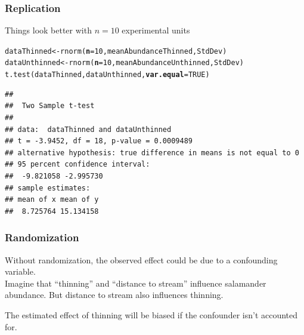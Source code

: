 \documentclass[color=usenames,dvipsnames]{beamer}\usepackage[]{graphicx}\usepackage[]{color}
\makeatletter
\newcommand{\hlnum}[1]{\textcolor[rgb]{0.69,0.494,0}{#1}}%
\newcommand{\hlstd}[1]{\textcolor[rgb]{0,0,0}{#1}}%
\newcommand{\hlkwb}[1]{\textcolor[rgb]{0,0.341,0.682}{#1}}%
\newcommand{\hlkwc}[1]{\textcolor[rgb]{0,0,0}{\textbf{#1}}}%
\newcommand{\hlkwd}[1]{\textcolor[rgb]{0.004,0.004,0.506}{#1}}%
\newenvironment{kframe}{%
 \def\at@end@of@kframe{}%
 \ifinner\ifhmode%
  \def\at@end@of@kframe{\end{minipage}}%
  \begin{minipage}{\columnwidth}%
 \fi\fi%
 \def\FrameCommand##1{\hskip\@totalleftmargin \hskip-\fboxsep
 \colorbox{shadecolor}{##1}\hskip-\fboxsep
     \hskip-\linewidth \hskip-\@totalleftmargin \hskip\columnwidth}%
 \MakeFramed {\advance\hsize-\width
   \@totalleftmargin\z@ \linewidth\hsize
   \@setminipage}}%
 {\par\unskip\endMakeFramed%
 \at@end@of@kframe}
\newenvironment{knitrout}{}{} %
\makeatother
\begin{document}
\begin{frame}[fragile]
  \frametitle{Replication}
  Things look better with $n=10$ experimental units \\
\begin{knitrout}\scriptsize
{}\color{fgcolor}\begin{kframe}
\begin{alltt}
\hlstd{dataThinned} \hlkwb{<-} \hlkwd{rnorm}\hlstd{(}\hlkwc{n}\hlstd{=}\hlnum{10}\hlstd{, meanAbundanceThinned, StdDev)}
\hlstd{dataUnthinned} \hlkwb{<-} \hlkwd{rnorm}\hlstd{(}\hlkwc{n}\hlstd{=}\hlnum{10}\hlstd{, meanAbundanceUnthinned, StdDev)}
\hlkwd{t.test}\hlstd{(dataThinned, dataUnthinned,} \hlkwc{var.equal}\hlstd{=}\hlnum{TRUE}\hlstd{)}
\end{alltt}
\begin{verbatim}
## 
## 	Two Sample t-test
## 
## data:  dataThinned and dataUnthinned
## t = -3.9452, df = 18, p-value = 0.0009489
## alternative hypothesis: true difference in means is not equal to 0
## 95 percent confidence interval:
##  -9.821058 -2.995730
## sample estimates:
## mean of x mean of y 
##  8.725764 15.134158
\end{verbatim}
\end{kframe}
\end{knitrout}
\end{frame}



\begin{frame}
  \frametitle{Randomization}
  \small
  Without randomization, the observed effect could be due to a
  confounding variable. \\ %
  \vfill
  Imagine that ``thinning'' and ``distance to stream'' influence
  salamander abundance. But distance to stream also
  influences thinning. \\
  \begin{center}
 \end{center}
 \pause
 \vfill
 The estimated effect of thinning will be biased if the confounder
 isn't accounted for. 
\end{frame}
\end{document}
